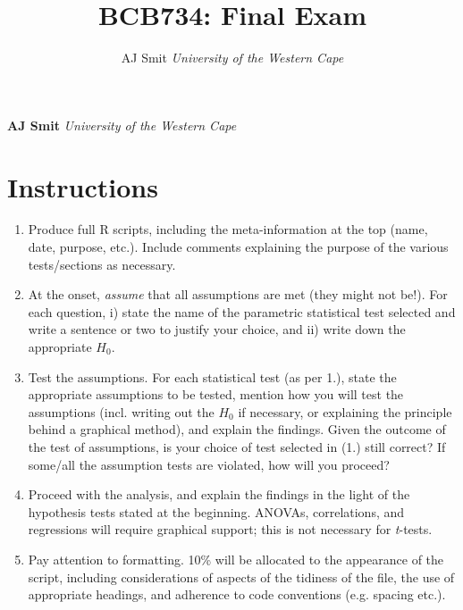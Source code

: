 \documentclass[10pt,a4,]{article}
\title{BCB734: Final Exam  }
\author{\Large AJ
Smit\vspace{0.05in} \newline\normalsize\emph{University of the Western
Cape}  }
\date{}
\newcommand*{\authorfont}{\fontfamily{phv}\selectfont}
\begin{document}

{%
\setlength{\parindent}{0pt}
\thispagestyle{plain}
{\fontsize{18}{20}\selectfont\raggedright
\maketitle  %
}
{
   \vskip 13.5pt\relax \normalsize\fontsize{11}{12}
\textbf{\authorfont AJ Smit} \hskip 15pt \emph{\small University of the
Western Cape}   
}
}



\vskip 6.5pt

\noindent 

\section*{Instructions}

\begin{enumerate}
\item Produce full R scripts, including the meta-information at the top (name, date, purpose, etc.). Include comments explaining the purpose of the various tests/sections as necessary.
\item At the onset, \emph{assume} that all assumptions are met (they might not be!). For each question, i) state the name of the parametric statistical test selected and write a sentence or two to justify your choice, and ii) write down the appropriate $H_{0}$.
\item Test the assumptions. For each statistical test (as per 1.), state the appropriate assumptions to be tested, mention how you will test the assumptions (incl. writing out the $H_{0}$ if necessary, or explaining the principle behind a graphical method), and explain the findings. Given the outcome of the test of assumptions, is your choice of test selected in (1.) still correct? If some/all the assumption tests are violated, how will you proceed? 
\item Proceed with the analysis, and explain the findings in the light of the hypothesis tests stated at the beginning. ANOVAs, correlations, and regressions will require graphical support; this is not necessary for \emph{t}-tests.
\item Pay attention to formatting. 10\% will be allocated to the appearance of the script, including considerations of aspects of the tidiness of the file, the use of appropriate headings, and adherence to code conventions (e.g. spacing etc.).
\end{enumerate}
\end{document}
